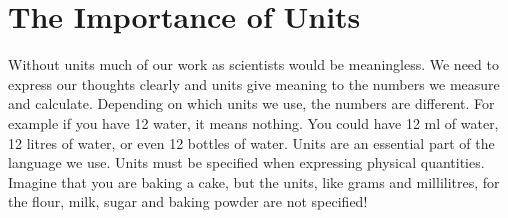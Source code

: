 \section{The Importance of Units}
Without units much of our work as scientists would be meaningless. We need to express our thoughts clearly and units give meaning to the numbers we measure and calculate. Depending on which units we use, the numbers are different. For example if you have 12 water, it means nothing. You could have 12 ml of water, 12 litres of water, or even 12 bottles of water. Units are an essential part of the language we use. Units must be specified when expressing physical quantities. Imagine that you are baking a cake, but the units, like grams and millilitres, for the flour, milk, sugar and baking powder are not specified!


